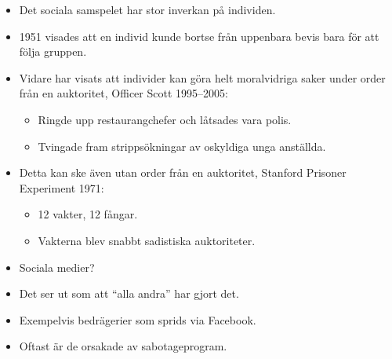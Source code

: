 \begin{frame}
  \begin{itemize}
    \item Det sociala samspelet har stor inverkan på individen.

    \item 1951 visades att en individ kunde bortse från uppenbara bevis bara 
      för att följa gruppen.

      \pause{}

    \item Vidare har visats att individer kan göra helt moralvidriga saker 
      under order från en auktoritet, Officer Scott 1995--2005:
      \begin{itemize}
        \item Ringde upp restaurangchefer och låtsades vara polis.
        \item Tvingade fram strippsökningar av oskyldiga unga anställda.
      \end{itemize}

      \pause{}

    \item Detta kan ske även utan order från en auktoritet, Stanford Prisoner 
      Experiment 1971:
      \begin{itemize}
        \item 12 vakter, 12 fångar.
        \item Vakterna blev snabbt sadistiska auktoriteter.
      \end{itemize}

  \end{itemize}
\end{frame}

\begin{frame}
  \begin{itemize}
    \item Sociala medier?

      \pause{}

    \item Det ser ut som att \enquote{alla andra} har gjort det.
    \item Exempelvis bedrägerier som sprids via Facebook.
    \item Oftast är de orsakade av sabotageprogram.
  \end{itemize}
\end{frame}

%
%
%




\begin{frame}[allowframebreaks]
	\small
  \printbibliography
\end{frame}

